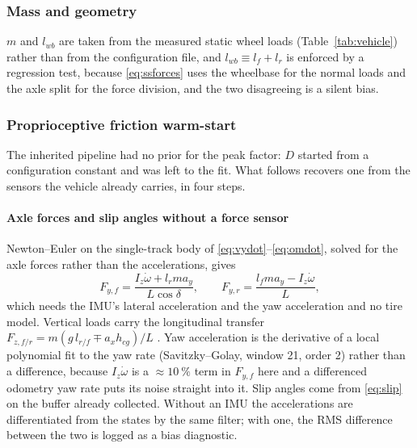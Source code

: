 \subsubsection{Mass and geometry}
$m$ and $l_{wb}$ are taken from the measured static wheel loads
(Table~\ref{tab:vehicle}) rather than from the configuration file, and
$l_{wb}\equiv l_{f}+l_{r}$ is enforced by a regression test, because
\eqref{eq:ssforces} uses the wheelbase for the normal loads and the axle split
for the force division, and the two disagreeing is a silent bias.

\subsubsection{Proprioceptive friction warm-start}
\label{subsec:friction}
The inherited pipeline had no prior for the peak factor: $D$ started from a
configuration constant and was left to the fit. What follows recovers one from
the sensors the vehicle already carries, in four steps.

\paragraph{Axle forces and slip angles without a force sensor}
Newton--Euler on the single-track body of
\eqref{eq:vydot}--\eqref{eq:omdot}, solved for the axle forces rather than the
accelerations, gives
\begin{equation}
F_{y,f}=\frac{I_{z}\dot\omega+l_{r}m a_{y}}{L\cos\delta},\qquad
F_{y,r}=\frac{l_{f}m a_{y}-I_{z}\dot\omega}{L},
\label{eq:newtoneuler}
\end{equation}
which needs the IMU's lateral acceleration and the yaw acceleration and no tire
model. Vertical loads carry the longitudinal transfer
$F_{z,f/r}=m(g\,l_{r/f}\mp a_{x}h_{cg})/L$ \cite{rajamani2012}. Yaw
acceleration is the derivative of a local polynomial fit to the yaw rate
(Savitzky--Golay, window 21, order 2) \cite{savitzky1964} rather than a
difference, because $I_{z}\dot\omega$ is a $\approx\SI{10}{\percent}$ term in
$F_{y,f}$ here and a differenced odometry yaw rate puts its noise straight into
it. Slip angles come from \eqref{eq:slip} on the buffer already collected.
Without an IMU the accelerations are differentiated from the states by the same
filter; with one, the RMS difference between the two is logged as a bias
diagnostic.

